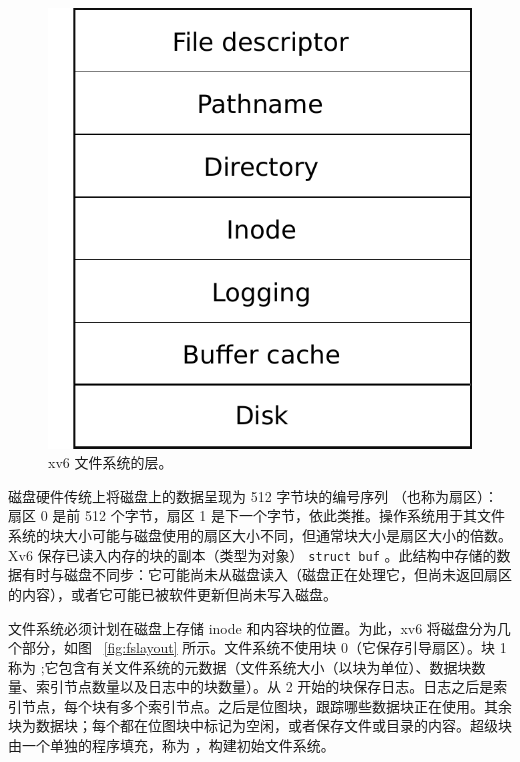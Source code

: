 \documentclass[UTF8]{article}
\begin{document}
   \begin{figure}[t]
\center
\includegraphics[scale=0.5]{fig/fslayer.pdf}
\caption{xv6 文件系统的层。  }
\label{fig:fslayer}
\end{figure}     

磁盘硬件传统上将磁盘上的数据呈现为 512 字节块的编号序列
       （也称为扇区）：
        扇区 0 是前 512 个字节，扇区 1 是下一个字节，依此类推。操作系统用于其文件系统的块大小可能与磁盘使用的扇区大小不同，但通常块大小是扇区大小的倍数。 Xv6 保存已读入内存的块的副本（类型为对象）
    \lstinline{struct buf}   
        。此结构中存储的数据有时与磁盘不同步：它可能尚未从磁盘读入（磁盘正在处理它，但尚未返回扇区的内容），或者它可能已被软件更新但尚未写入磁盘。  

文件系统必须计划在磁盘上存储 inode 和内容块的位置。为此，xv6 将磁盘分为几个部分，如图~    \ref{fig:fslayout}    所示。文件系统不使用块 0（它保存引导扇区）。块 1 称为
       ;它包含有关文件系统的元数据（文件系统大小（以块为单位）、数据块数量、索引节点数量以及日志中的块数量）。从 2 开始的块保存日志。日志之后是索引节点，每个块有多个索引节点。之后是位图块，跟踪哪些数据块正在使用。其余块为数据块；每个都在位图块中标记为空闲，或者保存文件或目录的内容。超级块由一个单独的程序填充，称为
        ，构建初始文件系统。  
\end{document}
